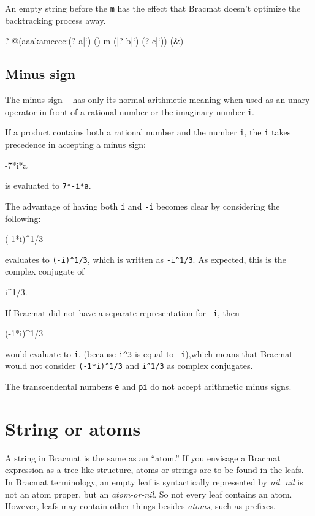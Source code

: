 \documentclass[12pt]{article}
\begin{document}
An empty string before the \verb|m| has the effect that Bracmat
doesn't optimize the backtracking process away.
\begin{ex}
{?} @(aaakamcccc:(? a|`) () m (|? b|`) (? c|`)) (&)
\end{ex}

\subsection{Minus sign}

The minus sign \verb|-| has only its normal arithmetic meaning when
used as an unary operator in front of a rational number or the
imaginary number \verb|i|.

If a product contains both a rational number and the number \verb|i|,
the \verb|i| takes precedence in accepting a minus sign:
\begin{v}
-7*i*a
\end{v}
is evaluated to \verb|7*-i*a|.

The advantage of having both \verb|i| and \verb|-i| becomes clear by
considering the following:
\begin{v}
(-1*i)^1/3
\end{v}
evaluates to \verb|(-i)^1/3|, which is written as \verb|-i^1/3|. As
expected, this is the complex conjugate of
\begin{v}
i^1/3.
\end{v}

If Bracmat did not have a separate representation for \verb|-i|, then
\begin{v}
(-1*i)^1/3
\end{v}
would evaluate to \verb|i|, (because \verb|i^3| is equal to
\verb|-i|),which means that Bracmat would not consider
\verb|(-1*i)^1/3| and \verb|i^1/3| as complex conjugates.

The transcendental numbers \verb|e| and \verb|pi| do not accept
arithmetic minus signs.

\section{String or atoms}

A string in Bracmat is the same as an ``atom.'' If you envisage a
Bracmat expression as a tree like structure, atoms or strings are to
be found in the leafs. In Bracmat terminology, an empty leaf is
syntactically represented by \emph{nil}. \emph{nil} is not an atom
proper, but an \emph{atom-or-nil}. So not every leaf contains an
atom. However, leafs may contain other things besides
\emph{atoms}, such as prefixes.
\end{document}
